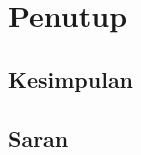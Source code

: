 \chapter{Penutup}
    \section{Kesimpulan}
        \Blindtext[5][1]
    \section{Saran}
        \Blindtext[5][1]
    \cleardoublepage
